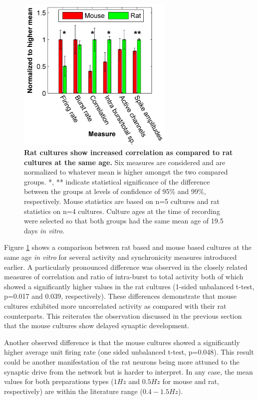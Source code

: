        \begin{figure}[!htb]
            \centering
            \includegraphics[width=7.5cm]{chapter3/figures/mouseRatComp/ratMouseComp.jpg}

            \caption[Comparison between spontaneous activity in mouse and rat based cultures]{\textbf{Rat cultures show increased correlation as compared to rat cultures at the same age.} Six measures are considered and are normalized to whatever mean is higher amongst the two compared groups. *, ** indicate statistical significance of the difference between the groups at levels of confidence of 95\% and 99\%, respectively. Mouse statistics are based on n=5 cultures and rat statistics on n=4 cultures. Culture ages at the time of recording were selected so that both groups had the same mean age of 19.5 days \textit{in vitro}.}
            \label{fig:activity:mouseRatComparison}
       \end{figure}

    Figure \ref{fig:activity:mouseRatComparison} shows a comparison between rat based and mouse based cultures at the same age \textit{in vitro} for several activity and synchronicity measures introduced earlier. A particularly pronounced difference was observed in the closely related measures of correlation and ratio of intra-burst to total activity both of which showed a significantly higher values in the rat cultures (1-sided unbalanced t-test, p=0.017 and 0.039, respectively). These differences demonstrate that mouse cultures exhibited more uncorrelated activity as compared with their rat counterparts. This reiterates the observation discussed in the previous section that the mouse cultures show delayed synaptic development.

    Another observed difference is that the mouse cultures showed a significantly higher average unit firing rate (one sided unbalanced t-test, p=0.048). This result could be another manifestation of the rat neurons being more attuned to the synaptic drive from the network but is harder to interpret. In any case, the mean values for both preparations types (\(1 Hz\) and \(0.5 Hz\) for mouse and rat, respectively) are within the literature range (\(0.4-1.5 Hz\)).

